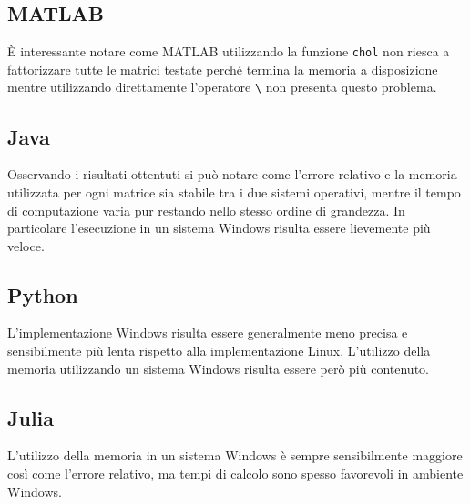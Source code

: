 \documentclass{report}
\begin{document}
            \subsection{MATLAB}
                \`E interessante notare come MATLAB utilizzando la funzione \texttt{chol} non riesca a fattorizzare
                tutte le matrici testate perché termina la memoria a disposizione mentre utilizzando direttamente
                l'operatore \verb$\$ non presenta questo problema.
            \subsection{Java}
                Osservando i risultati ottentuti si può notare come l'errore relativo e la memoria utilizzata per ogni 
                matrice sia stabile tra i due sistemi operativi, mentre il tempo di computazione varia pur restando 
                nello stesso ordine di grandezza. In particolare l'esecuzione in un sistema Windows risulta essere
                lievemente più veloce.
            \subsection{Python}
                L'implementazione Windows risulta essere generalmente meno precisa e sensibilmente più lenta rispetto
                alla implementazione Linux. L'utilizzo della memoria utilizzando un sistema Windows risulta essere però
                più contenuto.
            \subsection{Julia}
                L'utilizzo della memoria in un sistema Windows è sempre sensibilmente maggiore così come l'errore 
                relativo, ma tempi di calcolo sono spesso favorevoli in ambiente Windows.
        
\end{document}
